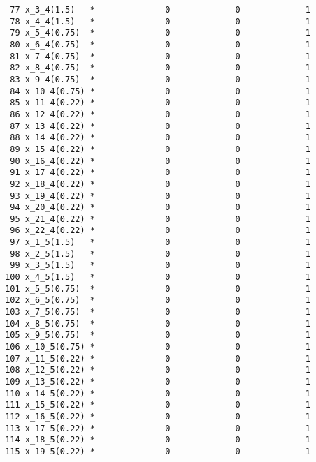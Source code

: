 \documentclass{article}[A4]
\begin{document}
\begin{verbatim}
	    77 x_3_4(1.5)   *              0             0             1 
	    78 x_4_4(1.5)   *              0             0             1 
	    79 x_5_4(0.75)  *              0             0             1 
	    80 x_6_4(0.75)  *              0             0             1 
	    81 x_7_4(0.75)  *              0             0             1 
	    82 x_8_4(0.75)  *              0             0             1 
	    83 x_9_4(0.75)  *              0             0             1 
	    84 x_10_4(0.75) *              0             0             1 
	    85 x_11_4(0.22) *              0             0             1 
	    86 x_12_4(0.22) *              0             0             1 
	    87 x_13_4(0.22) *              0             0             1 
	    88 x_14_4(0.22) *              0             0             1 
	    89 x_15_4(0.22) *              0             0             1 
	    90 x_16_4(0.22) *              0             0             1 
	    91 x_17_4(0.22) *              0             0             1 
	    92 x_18_4(0.22) *              0             0             1 
	    93 x_19_4(0.22) *              0             0             1 
	    94 x_20_4(0.22) *              0             0             1 
	    95 x_21_4(0.22) *              0             0             1 
	    96 x_22_4(0.22) *              0             0             1 
	    97 x_1_5(1.5)   *              0             0             1 
	    98 x_2_5(1.5)   *              0             0             1 
	    99 x_3_5(1.5)   *              0             0             1 
	   100 x_4_5(1.5)   *              0             0             1 
	   101 x_5_5(0.75)  *              0             0             1 
	   102 x_6_5(0.75)  *              0             0             1 
	   103 x_7_5(0.75)  *              0             0             1 
	   104 x_8_5(0.75)  *              0             0             1 
	   105 x_9_5(0.75)  *              0             0             1 
	   106 x_10_5(0.75) *              0             0             1 
	   107 x_11_5(0.22) *              0             0             1 
	   108 x_12_5(0.22) *              0             0             1 
	   109 x_13_5(0.22) *              0             0             1 
	   110 x_14_5(0.22) *              0             0             1 
	   111 x_15_5(0.22) *              0             0             1 
	   112 x_16_5(0.22) *              0             0             1 
	   113 x_17_5(0.22) *              0             0             1 
	   114 x_18_5(0.22) *              0             0             1 
	   115 x_19_5(0.22) *              0             0             1 

\end{verbatim}
\end{document}
